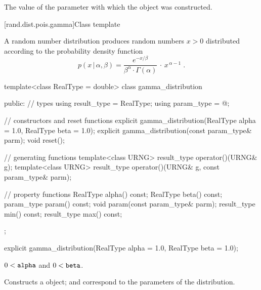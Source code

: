 \begin{itemdescr}
\pnum\returns The value of the  parameter
 with which the object was constructed.
\end{itemdescr}


[rand.dist.pois.gamma]{Class template }%
%

\pnum
A  random number distribution
produces random numbers $x > 0$
distributed according to
the probability density function%
%
\[%
 p(x\,|\,\alpha,\beta)
      = \frac{e^{-x/\beta}}{\beta^{\alpha} \cdot \Gamma(\alpha)}
        \, \cdot \, x^{\, \alpha-1}
\; \mbox{.}
\]

\begin{codeblock}
template<class RealType = double>
 class gamma_distribution
{
public:
 // types
 using result_type = RealType;
 using param_type  = @\unspec@;

 // constructors and reset functions
 explicit gamma_distribution(RealType alpha = 1.0, RealType beta = 1.0);
 explicit gamma_distribution(const param_type& parm);
 void reset();

 // generating functions
 template<class URNG>
   result_type operator()(URNG& g);
 template<class URNG>
   result_type operator()(URNG& g, const param_type& parm);

 // property functions
 RealType alpha() const;
 RealType beta() const;
 param_type param() const;
 void param(const param_type& parm);
 result_type min() const;
 result_type max() const;
};
\end{codeblock}


%
\begin{itemdecl}
explicit gamma_distribution(RealType alpha = 1.0, RealType beta = 1.0);
\end{itemdecl}

\begin{itemdescr}
\pnum\requires
 $ 0 < \texttt{alpha} $
 and $ 0 < \texttt{beta} $.

\pnum\effects Constructs a  object;
  and 
 correspond to the parameters of the distribution.
\end{itemdescr}

